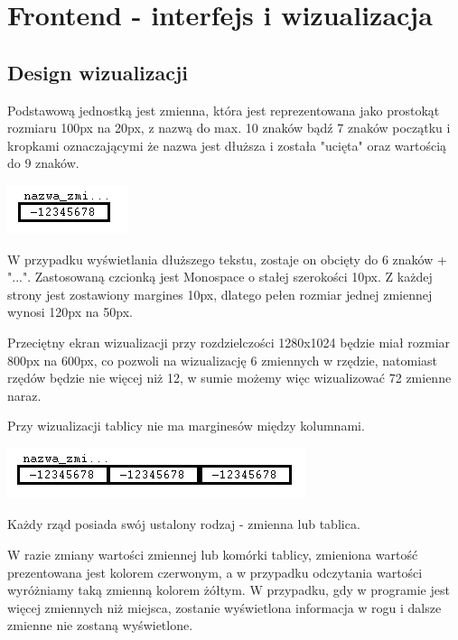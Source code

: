 \documentclass[a4paper,twoside,openright,11pt]{report}
\begin{document}
  \chapter{Frontend - interfejs i wizualizacja}
  
  \section {Design wizualizacji}
\par Podstawową jednostką jest zmienna, która jest reprezentowana jako prostokąt rozmiaru 100px na 20px, z nazwą do max. 10 znaków bądź 7 znaków początku i kropkami oznaczającymi że nazwa jest dłuższa i została "ucięta" oraz wartością do 9 znaków. 

\begin{center}
  \includegraphics[scale=0.8]{wiz1}
\end{center}

\par W przypadku wyświetlania dłuższego tekstu, zostaje on obcięty do 6 znaków + "...".
Zastosowaną czcionką jest Monospace o stałej szerokości 10px. Z każdej strony jest zostawiony margines 10px, dlatego pełen rozmiar jednej zmiennej wynosi 120px na 50px.
\par Przeciętny ekran wizualizacji przy rozdzielczości 1280x1024 będzie miał rozmiar 800px na 600px, co pozwoli na wizualizację 6 zmiennych w rzędzie, natomiast rzędów będzie nie więcej niż 12, w sumie możemy więc wizualizować 72 zmienne naraz. 
\par Przy wizualizacji tablicy nie ma marginesów między kolumnami.

\begin{center}
  \includegraphics[scale=0.8]{wiz2}
\end{center}

\par Każdy rząd posiada swój ustalony rodzaj - zmienna lub tablica.
\par W razie zmiany wartości zmiennej lub komórki tablicy, zmieniona wartość prezentowana jest kolorem czerwonym, a w przypadku odczytania wartości wyróżniamy taką zmienną kolorem żółtym. W przypadku, gdy w programie jest więcej zmiennych niż miejsca, zostanie wyświetlona informacja w rogu i dalsze zmienne nie zostaną wyświetlone.
\end{document}
